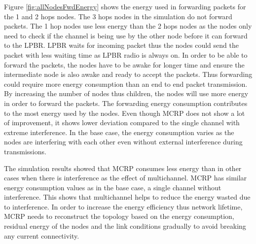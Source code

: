 Figure \ref{fig:allNodesFwdEnergy} shows the energy used in forwarding packets for the 1 and 2 hops nodes. The 3 hops nodes in the simulation do not forward packets. The 1 hop nodes use less energy than the 2 hops nodes as the nodes only need to check if the channel is being use by the other node before it can forward to the LPBR. LPBR waits for incoming packet thus the nodes could send the packet with less waiting time as LPBR radio is always on. 
In order to be able to forward the packets, the nodes have to be awake for longer time and ensure the intermediate node is also awake and ready to accept the packets. Thus forwarding could require more energy consumption than an end to end packet transmission. By increasing the number of nodes thus children, the nodes will use more energy in order to forward the packets. The forwarding energy consumption contributes to the most energy used by the nodes. 
Even though MCRP does not show a lot of improvement, it shows lower deviation compared to the single channel with extreme interference.
In the base case, the energy consumption varies as the nodes are interfering with each other even without external interference during transmissions.


The simulation results showed that MCRP consumes less energy than in other cases when there is interference as the effect of multichannel. MCRP has similar energy consumption values as in the base case, a single channel without interference. This shows that multichannel helps to reduce the energy wasted due to interference. In order to increase the energy efficiency thus network lifetime, MCRP needs to reconstruct the topology based on the energy consumption, residual energy of the nodes and the link conditions gradually to avoid breaking any current connectivity.
